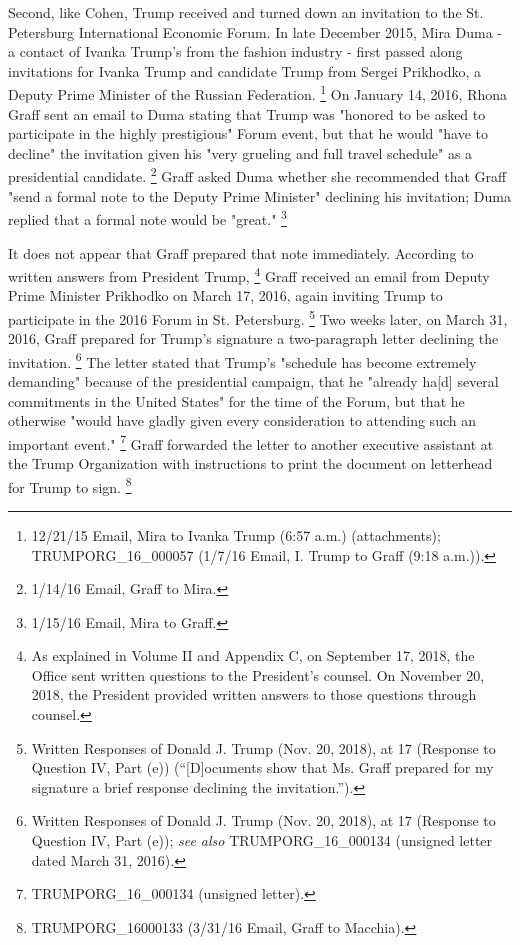 Second, like Cohen, Trump received and turned down an invitation to the St. Petersburg International Economic Forum.
In late December 2015, Mira Duma - a contact of Ivanka Trump's from the fashion industry - first passed along invitations for Ivanka Trump and candidate Trump from Sergei Prikhodko, a Deputy Prime Minister of the Russian Federation.%
\footnote{12/21/15 Email, Mira to Ivanka Trump (6:57 a.m.) (attachments);
TRUMPORG\_16\_000057 (1/7/16 Email, I. Trump to Graff (9:18 a.m.)).}
On January 14, 2016, Rhona Graff sent an email to Duma stating that Trump was "honored to be asked to participate in the highly prestigious" Forum event, but that he would "have to decline" the invitation given his "very grueling and full travel schedule" as a presidential candidate.%
\footnote{1/14/16 Email, Graff to Mira.}
Graff asked Duma whether she recommended that Graff "send a formal note to the Deputy Prime Minister" declining his invitation; Duma replied that a formal note would be "great."%
\footnote{1/15/16 Email, Mira to Graff.}

It does not appear that Graff prepared that note immediately.
According to written answers from President Trump,%
\footnote{As explained in Volume II and Appendix C, on September 17, 2018, the Office sent written questions to the President’s counsel.
On November 20, 2018, the President provided written answers to those questions through counsel.}
Graff received an email from Deputy Prime Minister Prikhodko on March 17, 2016, again inviting Trump to participate in the 2016 Forum in St. Petersburg.%
\footnote{Written Responses of Donald J. Trump (Nov. 20, 2018), at 17 (Response to Question IV, Part (e)) (“[D]ocuments show that Ms. Graff prepared for my signature a brief response declining the invitation.”).}
Two weeks later, on March 31, 2016, Graff prepared for Trump's signature a two-paragraph letter declining the invitation.%
\footnote{Written Responses of Donald J. Trump (Nov. 20, 2018), at 17 (Response to Question IV, Part (e));
\textit{see also} TRUMPORG\_16\_000134 (unsigned letter dated March 31, 2016).}
The letter stated that Trump's "schedule has become extremely demanding" because of the presidential campaign, that he "already ha[d] several commitments in the United States" for the time of the Forum, but that he otherwise "would have gladly given every consideration to attending such an important event."%
\footnote{TRUMPORG\_16\_000134 (unsigned letter).}
Graff forwarded the letter to another executive assistant at the Trump Organization with instructions to print the document on letterhead for Trump to sign.%
\footnote{TRUMPORG\_16000133 (3/31/16 Email, Graff to Macchia).}

